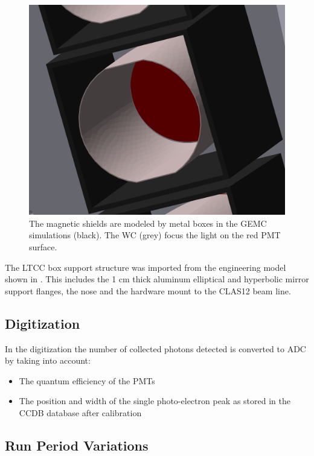 \begin{figure}
	\centering
	\includegraphics[width=0.95\columnwidth,keepaspectratio]{img/simShield.png}
	\caption{The magnetic shields are modeled by metal boxes in the GEMC simulations (black). The WC (grey) focus the light on the red PMT surface.}
	\label{fig:simShield}
\end{figure}


The LTCC box support structure was imported from the engineering model shown in . This includes the 1 cm thick aluminum
elliptical and hyperbolic mirror support flanges, the nose and the hardware mount to the CLAS12 beam line.


\subsection{Digitization}

In the digitization the number of collected photons detected is converted to ADC by taking into account:

\begin{itemize}
	\item The quantum efficiency of the PMTs
	\item The position and width of the single photo-electron peak as stored in the CCDB database after calibration
\end{itemize}


\subsection{Run Period Variations}

